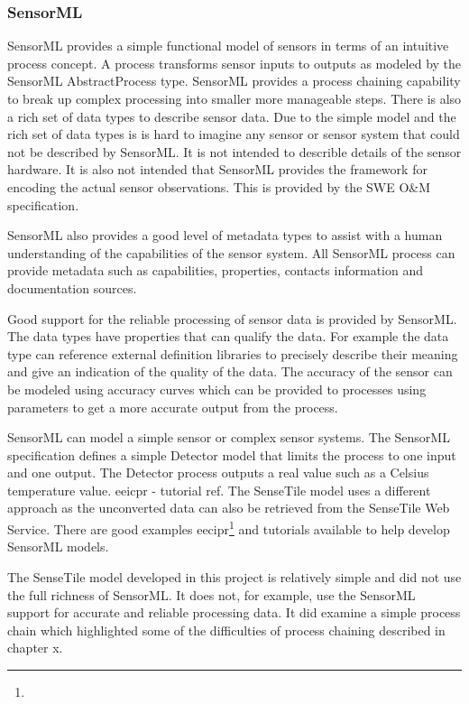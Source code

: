 \documentclass[]{final_report}
\begin{document}
\subsubsection{SensorML}
SensorML provides a simple functional model of sensors in terms of an intuitive process concept. A process transforms sensor inputs to outputs as modeled by the SensorML AbstractProcess type. SensorML provides a process chaining capability to break up complex processing into smaller more manageable steps. There is also a rich set of data types to describe sensor data. Due to the simple model and the rich set of data types is is hard to imagine any sensor or sensor system that could not be described by SensorML. It is not intended to describle details of the sensor hardware. It is also not intended that SensorML provides the framework for encoding the actual sensor observations. This is provided by the SWE O\&M specification.

SensorML also provides a good level of metadata types to assist with a human understanding of the capabilities of the sensor system. All SensorML process can provide metadata such as capabilities, properties, contacts information and documentation sources.

Good support for the reliable processing of sensor data is provided by SensorML. The data types have properties that can qualify the data. For example the data type can reference external definition libraries to precisely describe their meaning and give an indication of the quality of the data. The accuracy of the sensor can be modeled using accuracy curves which can be provided to processes using parameters to get a more accurate output from the process.

SensorML can model a simple sensor or complex sensor systems. The SensorML specification defines a simple Detector model that limits the process to one input and one output. The Detector process outputs a real value such as a Celsius temperature value. eeicpr - tutorial ref. The SenseTile model uses a different approach as the unconverted data can also be retrieved from the SenseTile Web Service. There are good examples eecipr\footnote{} and tutorials available to help develop SensorML models. 

The SenseTile model developed in this project is relatively simple and did not use the full richness of SensorML. It does not, for example, use the SensorML support for accurate and reliable processing data. It did examine a simple process chain which highlighted some of the difficulties of process chaining described in chapter x.
\end{document}
